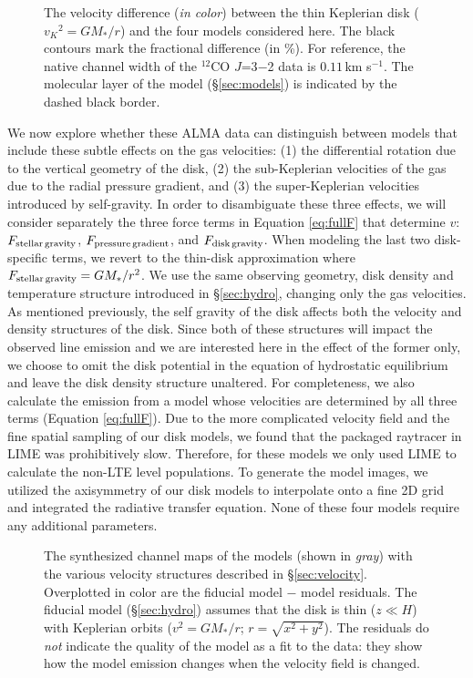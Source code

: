 \begin{figure}[t!]
\caption{The velocity difference ({\it in color}) between the thin Keplerian 
disk (${v_K}^2 = G M_\ast /r$) and the four models
considered here.  The black contours mark the 
fractional difference (in \%).  For reference, the native channel width of
the $^{12}$CO $J$=3$-$2 data is $0.11$\,km s$^{-1}$. The molecular layer of the 
model (\S\ref{sec:models}) is indicated by the dashed black border.
\label{fig:veloc}}
\end{figure}

We now explore whether these ALMA data can distinguish between models that 
include these subtle effects on the gas velocities: (1) the differential 
rotation due to the vertical geometry of the disk, (2) the sub-Keplerian 
velocities of the gas due to the radial pressure gradient, and (3) the 
super-Keplerian velocities introduced by self-gravity.  In order to disambiguate
these three effects, we will consider separately the three force terms in 
Equation \ref{eq:fullF} that determine $v$: $F_{\rm stellar\,gravity}$, 
$F_{\rm pressure\,gradient}$, and $F_{\rm disk\,gravity}$.
When modeling the last two disk-specific terms, we revert to the thin-disk 
approximation where $F_{\rm stellar\,gravity}=GM_\ast/r^2$.  We use the same 
observing geometry, disk density and temperature structure introduced in 
\S\ref{sec:hydro}, changing only the gas velocities.  As mentioned
previously, the self gravity of the disk affects both the velocity and 
density structures of the disk.  Since both of these structures will impact the 
observed line emission and we are interested here in the effect of the former 
only, we choose to omit the disk potential in the equation of hydrostatic 
equilibrium and leave the disk density structure unaltered.  For completeness, 
we also calculate the emission from a model whose velocities are determined by 
all three terms (Equation \ref{eq:fullF}).  Due to the more complicated velocity
field and the fine spatial sampling of our disk models, we found that the 
packaged raytracer in LIME was prohibitively slow.  Therefore, for these models 
we only used LIME to calculate the non-LTE level populations.  To generate the 
model images, we utilized the axisymmetry of our disk models to interpolate 
onto a fine 2D grid \citep{fan05} and integrated the radiative transfer 
equation.  None of these four models require any additional parameters.

\begin{figure}[t!]
\caption{The synthesized channel maps of the models (shown in {\it gray}) 
with the various velocity structures described in \S\ref{sec:velocity}.  
Overplotted in color are the fiducial model $-$ model residuals.  The fiducial 
model (\S\ref{sec:hydro}) assumes that the disk is thin ($z \ll H$) with 
Keplerian orbits ($v^2 = G M_\ast/r$; $r=\sqrt{x^2 + y^2}$).  The residuals do 
{\it not} indicate the quality of the model as a fit to the data: they show how 
the model emission changes when the velocity field is changed.
\label{fig:effects}}
\end{figure}

